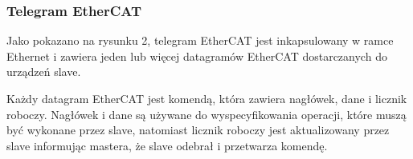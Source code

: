 \subsubsection{Telegram EtherCAT}
Jako pokazano na rysunku 2, telegram EtherCAT jest inkapsulowany w  ramce Ethernet i  zawiera jeden lub więcej datagramów EtherCAT dostarczanych do urządzeń slave. 

Każdy datagram EtherCAT jest komendą, która zawiera nagłówek, dane i licznik roboczy. Nagłówek i  dane są używane do wyspecyfikowania operacji, które muszą być wykonane przez slave, natomiast licznik roboczy jest aktualizowany przez slave informując mastera, że slave odebrał i przetwarza komendę.
\subsubsection{}
\subsubsection{}
\subsubsection{}
\subsubsection{}
\subsubsection{}
